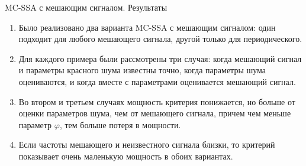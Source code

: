\documentclass[pdf,notheorems,10pt,intlimits, unicode]{beamer}
\newcommand{\bluetext}[1]{{\usebeamercolor[fg]{bluetext_color}#1}}
\begin{document}
\begin{frame}{MC-SSA с мешающим сигналом. Результаты}
  \begin{enumerate}
    \item Было реализовано два варианта MC-SSA с мешающим сигналом: один подходит для любого мешающего сигнала, другой только для периодического.\medskip
    \item Для каждого примера были рассмотрены три случая: когда мешающий сигнал и параметры красного шума известны точно, когда параметры шума оцениваются, и когда вместе с параметрами оценивается мешающий сигнал.\medskip
    \item Во втором и третьем случаях мощность критерия понижается, но больше от оценки параметров шума, чем от мешающего сигнала, причем чем меньше параметр $\varphi$, тем больше потеря в мощности.\medskip
    \item Если частоты мешающего и неизвестного сигнала близки, то критерий показывает очень маленькую мощность в обоих вариантах.
  \end{enumerate}
\end{frame}


  

  
  
  
\end{document}
